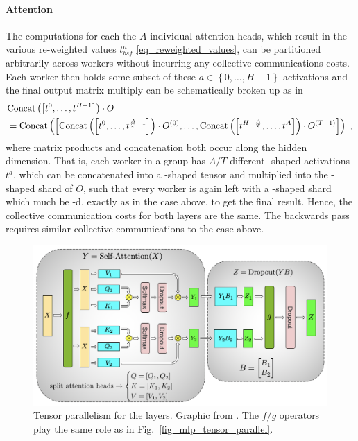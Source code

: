 \documentclass[11pt]{article}
\begin{document}
 \paragraph{Attention} The computations for each the $ A $ individual attention heads, which result
 in the various re-weighted values $ t ^{ a }_{ bsf } $ \eqref{eq_reweighted_values}, can be
 partitioned arbitrarily across workers without incurring any collective communications costs.  Each
 worker then holds some subset of these $ a \in \left \{ 0, \ldots , H-1 \right \} $ activations and
 the final output matrix multiply can be schematically broken up as in \begin{align} &{\rm Concat}
     \left ( \left [ t ^{ 0 }, \ldots , t ^{ H-1 } \right ] \right ) \cdot O \nonumber\\ &= {\rm Concat}
     \left ( \left [ {\rm Concat}\left ( \left [ t ^{ 0 }, \ldots , t ^{ \frac{ A }{ T }-1 } \right
     ] \right ) \cdot O ^{ (0) }, \ldots ,{\rm Concat}\left ( \left [ t ^{ H-\frac{ A }{ T } },
\ldots , t ^{ A} \right ] \right ) \cdot O ^{ (T-1) } \right ] \right ) \ , \end{align} where matrix
products and concatenation both occur along the hidden dimension. That is, each worker in a group
has $ A/T $ different -shaped activations $ t ^{ a } $, which can be
concatenated into a -shaped tensor and multiplied into the
-shaped shard of $ O $, such that every worker is again left with a
-shaped shard which much be -d, exactly as in the
 case above, to get the final result.  Hence, the collective communication costs for both layers are the same.
 The backwards pass requires similar collective communications to the 
case above.


 \begin{figure}[ht]
     \centering
     \includegraphics[scale=.45]{figures/attention_mp_2.png}
     \caption{Tensor parallelism for the  layers. Graphic from
     \cite{shoeybi2020megatronlm}. The $ f/g $ operators play the same role as in
 Fig.~\ref{fig_mlp_tensor_parallel}.}
     \label{fig_attn_tensor_parallel}
 \end{figure}
\end{document}
